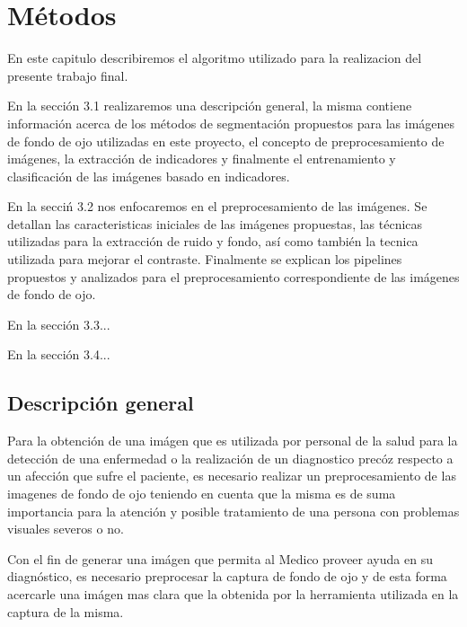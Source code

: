 
\chapter{M\'etodos} %

En este capitulo describiremos el algoritmo utilizado para la realizacion del presente trabajo final.

En la secci\'on 3.1 realizaremos una descripci\'on general, la misma contiene informaci\'on acerca de  los m\'etodos de segmentaci\'on propuestos para las im\'agenes de fondo de ojo utilizadas en este proyecto, el concepto de preprocesamiento de im\'agenes, la extracci\'on de indicadores y finalmente el entrenamiento y clasificaci\'on de las im\'agenes basado en indicadores.

En la secci\'n 3.2 nos enfocaremos en el preprocesamiento de las im\'agenes. Se detallan las caracteristicas iniciales de las im\'agenes propuestas, las t\'ecnicas utilizadas para la extracci\'on de ruido y fondo, as\'i como tambi\'en la tecnica utilizada para mejorar el contraste. Finalmente se explican los pipelines propuestos y analizados para el preprocesamiento correspondiente de las im\'agenes de fondo de ojo.

En la secci\'on 3.3...

En la secci\'on 3.4...
\label{Chapter3} %


\section{Descripci\'on general}

Para la obtenci\'on de una im\'agen que es utilizada por personal de la salud para la detecci\'on de una enfermedad o la realizaci\'on de un diagnostico prec\'oz respecto a un afecci\'on que sufre el paciente, es necesario realizar un preprocesamiento de las imagenes de fondo de ojo teniendo en cuenta que la misma es de suma importancia para la atenci\'on y posible tratamiento de una persona con problemas visuales severos o no.

Con el fin de generar una im\'agen que permita al Medico proveer ayuda en su diagn\'ostico, es necesario preprocesar la captura de fondo de ojo y de esta forma acercarle una im\'agen mas clara que la obtenida por la herramienta utilizada en la captura de la misma.




